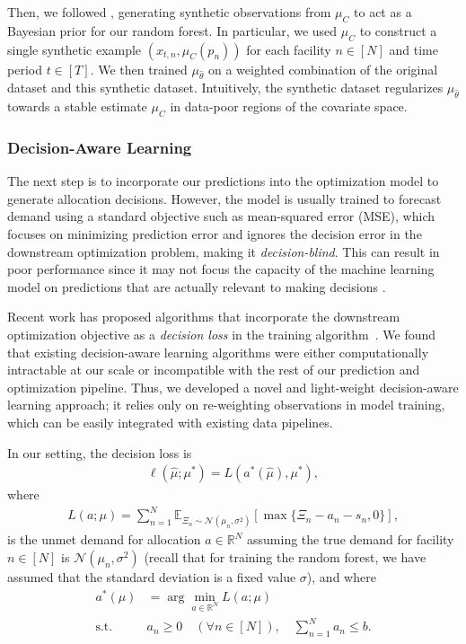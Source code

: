 \documentclass[12pt]{article}
\begin{document}
Then, we followed \cite{huang2020catalytic}, generating synthetic observations from $\mu_C$ to act as a Bayesian prior for our random forest. In particular, we used $\mu_C$ to construct a single synthetic example $(x_{t,n},\mu_C(p_n))$ for each facility $n\in[N]$ and time period $t\in[T]$. We then trained $\mu_{\hat\theta}$ on a weighted combination of the original dataset and this synthetic dataset. Intuitively, the synthetic dataset regularizes $\mu_{\hat\theta}$ towards a stable estimate $\mu_C$ in data-poor regions of the covariate space.

\subsubsection{Decision-Aware Learning}
\label{sup:dawarelearning}

The next step is to incorporate our predictions into the optimization model to generate allocation decisions. However, the model is usually trained to forecast demand using a standard objective such as mean-squared error (MSE), which focuses on minimizing prediction error and ignores the decision error in the downstream optimization problem, making it \emph{decision-blind}. This can result in poor performance since it may not focus the capacity of the machine learning model on predictions that are actually relevant to making decisions \cite{bertsimas2020predictive,elmachtoub2022smart}.

Recent work has proposed algorithms that incorporate the downstream optimization objective as a \emph{decision loss} in the training algorithm~\cite{kotary2021end, bertsimas2020predictive}. We found that existing decision-aware learning algorithms were either computationally intractable at our scale or incompatible with the rest of our prediction and optimization pipeline. Thus, we developed a novel and light-weight decision-aware learning approach; it relies only on re-weighting observations in model training, which can be easily integrated with existing data pipelines.

In our setting, the decision loss is
\begin{align*}
\ell(\hat\mu;\mu^*)=L(a^*(\hat\mu),\mu^*),
\end{align*}
where
\begin{align*}
L(a;\mu)=\sum_{n=1}^N\mathbb{E}_{\Xi_n\sim\mathcal{N}(\mu_n,\sigma^2)}\left[\max\{\Xi_n-a_n-s_n,0\}\right],
\end{align*}
is the unmet demand for allocation $a\in\mathbb{R}^N$ assuming the true demand for facility $n\in[N]$ is $\mathcal{N}(\mu_n,\sigma^2)$ (recall that for training the random forest, we have assumed that the standard deviation is a fixed value $\sigma$), and where
\begin{align*}
a^*(\mu)
&= \arg\min_{a \in \mathbb{R}^N} L(a;\mu) \\
\text{s.t.}\quad
& a_n \ge 0 \quad (\forall n \in [N]),\quad \sum_{n=1}^{N} a_n \le b .
\end{align*}
\end{document}
